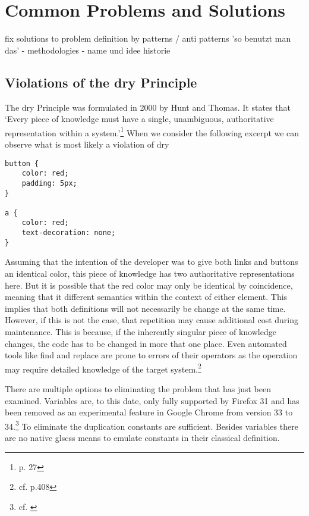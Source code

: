 

\chapter{Common Problems and Solutions}
fix solutions to problem
definition by patterns / anti patterns
'so benutzt man das'
- methodologies
- 
name und idee
historie



\section{Violations of the \acrlong{dry} Principle}
The \gls{dry} Principle was formulated in 2000 by Hunt and Thomas.
It states that 
`Every piece of knowledge must have a single, unambiguous, authoritative representation within a system.'\footnote{\cite{pragmaticprogrammer} p. 27}
When we consider the following excerpt we can observe what is most likely a violation of \gls{dry}

\begin{verbatim}
button {
    color: red;
    padding: 5px;
}

a {
    color: red;
    text-decoration: none;
}
\end{verbatim}

Assuming that the intention of the developer was to give both links and buttons an identical color, this piece of knowledge has two authoritative representations here.
But it is possible that the red color may only be identical by coincidence, meaning that it different semantics within the context of either element.
This implies that both definitions will not necessarily be change at the same time.
However, if this is not the case, that repetition may cause additional cost during maintenance.
This is because, if the inherently singular piece of knowledge changes, the code has to be changed in more that one place.
Even automated tools like find and replace are prone to errors of their operators as the operation may require detailed knowledge of the target system.\footnote{cf. \cite{humanautomation} p.408}

There are multiple options to eliminating the problem that has just been examined.
Variables are, to this date, only fully supported by Firefox 31 and has been removed as an experimental feature in Google Chrome from version 33 to 34.\footnote{cf. \cite{cssvariables}}
To eliminate the duplication constants are sufficient.
Besides variables there are no native gls{css} means to emulate constants in their classical definition.

